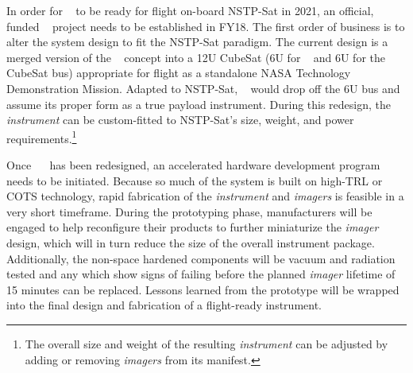 \documentclass{tufte-handout}
\begin{document}
In order for \sitsshort~ to be ready for flight on-board NSTP-Sat in 2021, an official,
funded \sitslong~ project needs to be established in FY18. The first order of business 
is to alter the system design to fit the NSTP-Sat paradigm. The current design is 
a merged version of the \sitsshort~ concept into a 12U CubeSat (6U for \sitsshort~ 
and 6U for the CubeSat bus) appropriate for flight as a standalone NASA Technology 
Demonstration Mission. Adapted to NSTP-Sat, \sitsshort~ would drop off the 6U bus and 
assume its proper form as a true payload instrument. During this redesign, the 
\textit{instrument} can be custom-fitted to NSTP-Sat's size, weight, and power 
requirements.\footnote{The overall size and weight of the resulting \textit{instrument} can
be adjusted by adding or removing \textit{imagers} from its manifest.} 


Once \sitsshort~~ has been redesigned, an accelerated hardware development program
needs to be initiated. Because so much of the system is built on high-TRL or COTS 
technology, rapid fabrication of the \textit{instrument} and \textit{imagers} is feasible in 
a very short timeframe. During the prototyping phase, manufacturers will be 
engaged to help reconfigure their products to further miniaturize the \textit{imager} 
design, which will in turn reduce the size of the overall instrument package.
Additionally, the non-space hardened components will be vacuum and radiation tested 
and any which show signs of failing before the planned \textit{imager} lifetime of 15 minutes
can be replaced. Lessons learned from the prototype will be wrapped into the final design
and fabrication of a flight-ready instrument.

\end{document}
